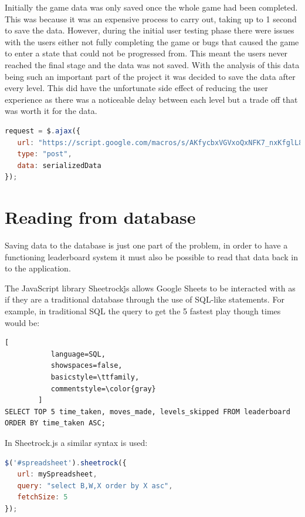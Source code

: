 \documentclass[12pt,a4paper]{report}
\begin{document}
Initially the game data was only saved once the whole game had been completed. This was because it was an expensive process to carry out, taking up to 1 second to save the data. However, during the initial user testing phase there were issues with the users either not fully completing the game or bugs that caused the game to enter a state that could not be progressed from. This meant the users never reached the final stage and the data was not saved. With the analysis of this data being such an important part of the project it was decided to save the data after every level. This did have the unfortunate side effect of reducing the user experience as there was a noticeable delay between each level but a trade off that was worth it for the data.

\begin{minipage}{\linewidth}
\begin{lstlisting}[language=JavaScript]
request = $.ajax({
   url: "https://script.google.com/macros/s/AKfycbxVGVxoQxNFK7_nxKfglL8yLNUmdPwP2e9j8IMO6JY5wzLEdSE/exec",
   type: "post",
   data: serializedData
});
\end{lstlisting}
\end{minipage}

\section{Reading from database}
Saving data to the database is just one part of the problem, in order to have a functioning leaderboard system it must also be possible to read that data back in to the application.

The JavaScript library Sheetrock\.js allows Google Sheets to be interacted with as if they are a traditional database through the use of SQL-like statements.
For example, in traditional SQL the query to get the 5 fastest play though times would be:

\begin{minipage}{\linewidth}
\begin{lstlisting}[
           language=SQL,
           showspaces=false,
           basicstyle=\ttfamily,
           commentstyle=\color{gray}
        ]
SELECT TOP 5 time_taken, moves_made, levels_skipped FROM leaderboard ORDER BY time_taken ASC;
\end{lstlisting}
\end{minipage}

In Sheetrock.js a similar syntax is used:

\begin{minipage}{\linewidth}
\begin{lstlisting}[language=JavaScript]
$('#spreadsheet').sheetrock({
   url: mySpreadsheet,
   query: "select B,W,X order by X asc",
   fetchSize: 5
});
\end{lstlisting}
\end{minipage}
\end{document}
